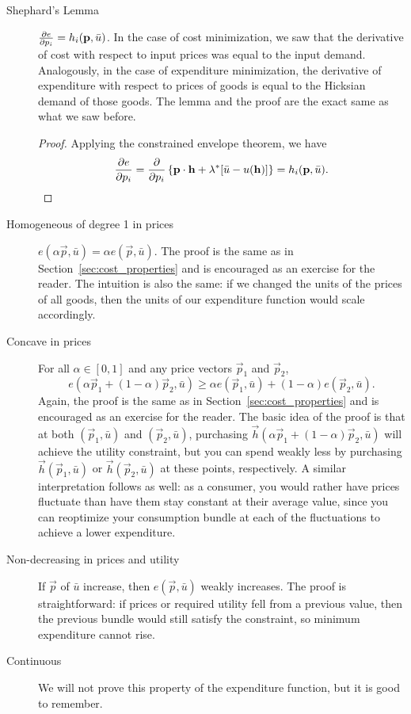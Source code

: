 \begin{description}
\item[Shephard's Lemma] $\pdv{e}{p_i}(\mathbf{p}, \bar{u}) = h_{i}(\mathbf{p}, \bar{u})$. In the case of cost minimization, we saw that the derivative of cost with respect to input prices was equal to the input demand. Analogously, in the case of expenditure minimization, the derivative of expenditure with respect to prices of goods is equal to the Hicksian demand of those goods. The lemma and the proof are the exact same as what we saw before.

\begin{proof}
Applying the constrained envelope theorem, we have
$$\pdv{e}{p_i}(\mathbf{p}, \bar{u}) = \frac{\partial}{\partial p_i}\left\{\mathbf{p} \cdot \mathbf{h}+\lambda^{*}[\bar{u}-u(\mathbf{h})]\right\} = h_{i}(\mathbf{p}, \bar{u}).$$
\end{proof}

\item[Homogeneous of degree 1 in prices] $e(\alpha\vec{p}, \bar{u}) = \alpha e(\vec{p}, \bar{u})$. The proof is the same as in Section~\ref{sec:cost_properties} and is encouraged as an exercise for the reader. The intuition is also the same: if we changed the units of the prices of all goods, then the units of our expenditure function would scale accordingly.

\item[Concave in prices] For all $\alpha \in [0, 1]$ and any price vectors $\vec{p}_1$ and $\vec{p}_2$, 
$$e(\alpha \vec{p}_1 + (1-\alpha)\vec{p}_2, \bar{u}) \geq \alpha e(\vec{p}_1, \bar{u}) + (1-\alpha) e(\vec{p}_2, \bar{u}).$$
Again, the proof is the same as in Section~\ref{sec:cost_properties} and is encouraged as an exercise for the reader. The basic idea of the proof is that at both $(\vec{p}_1, \bar{u})$ and $(\vec{p}_2, \bar{u})$, purchasing $\vec{h}(\alpha \vec{p}_1 + (1-\alpha)\vec{p}_2, \bar{u})$ will achieve the utility constraint, but you can spend weakly less by purchasing $\vec{h}(\vec{p}_1, \bar{u})$ or $\vec{h}(\vec{p}_2, \bar{u})$ at these points, respectively. A similar interpretation follows as well: as a consumer, you would rather have prices fluctuate than have them stay constant at their average value, since you can reoptimize your consumption bundle at each of the fluctuations to achieve a lower expenditure.

\item[Non-decreasing in prices and utility] If $\vec{p}$ of $\bar{u}$ increase, then $e(\vec{p}, \bar{u})$ weakly increases. The proof is straightforward: if prices or required utility fell from a previous value, then the previous bundle would still satisfy the constraint, so minimum expenditure cannot rise.

\item[Continuous] We will not prove this property of the expenditure function, but it is good to remember.

\end{description}

